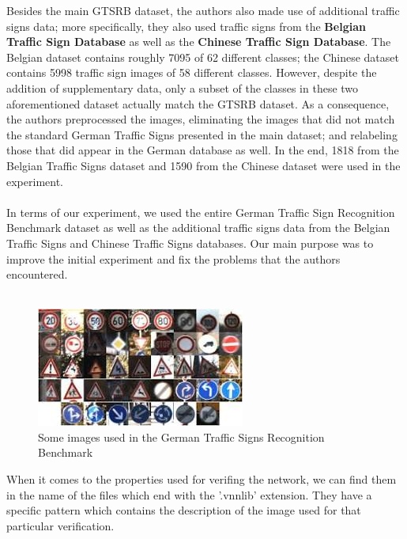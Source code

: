 \documentclass[12pt,a4paper]{report}
\newcommand\tab[1][5mm]{\hspace*{#1}}
\begin{document}
\tab Besides the main GTSRB dataset, the authors also made use of additional traffic signs data; more specifically, they also used traffic signs from the \textbf{Belgian Traffic Sign Database} as well as the \textbf{Chinese Traffic Sign Database}. The Belgian dataset contains roughly 7095 of 62 different classes; the Chinese dataset contains 5998 traffic sign images of 58 different classes. However, despite the addition of supplementary data, only a subset of the classes in these two aforementioned dataset actually match the GTSRB dataset. As a consequence, the authors preprocessed the images, eliminating the images that did not match the standard German Traffic Signs presented in the main dataset; and relabeling those that did appear in the German database as well. In the end, 1818 from the Belgian Traffic Signs dataset and 1590 from the Chinese dataset were used in the experiment.\\\\
\tab In terms of our experiment, we used the entire German Traffic Sign Recognition Benchmark dataset as well as the additional traffic signs data from the Belgian Traffic Signs and Chinese Traffic Signs databases. Our main purpose was to improve the initial experiment and fix the problems that the authors encountered. \\\\

\begin{figure}[h]
\centering
\includegraphics[scale=0.8]{figure2.jpg}
\caption{Some images used in the German Traffic Signs Recognition Benchmark}
\end{figure}

\tab When it comes to the properties used for verifing the network, we can find them in the name of the files which end with the '.vnnlib' extension. They have a specific pattern which contains the description of the image used for that particular verification.
\end{document}
